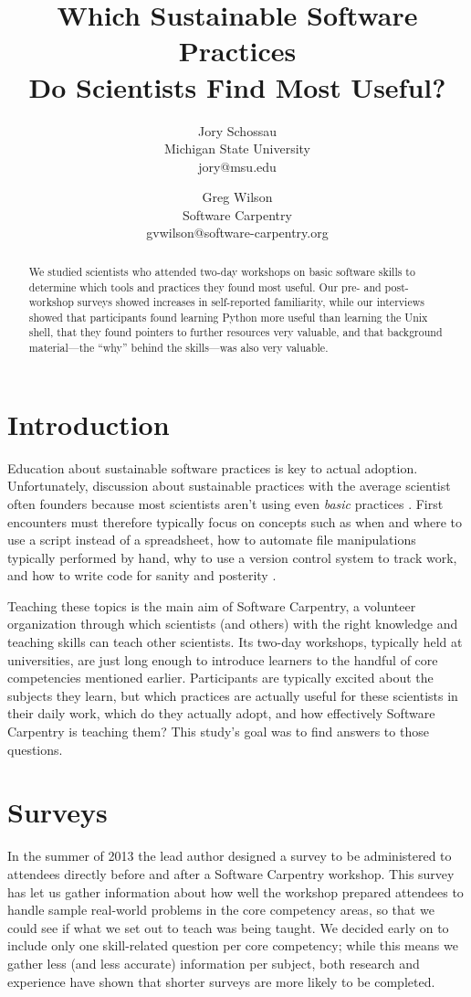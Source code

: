 \documentclass[10pt, twocolumn]{article}
\title{Which Sustainable Software Practices\\ Do Scientists Find Most Useful?}
\author{
	Jory Schossau \\
	\small{Michigan State University} \\
	\small{jory@msu.edu}
	\and
	Greg Wilson \\
	\small{Software Carpentry} \\
	\small{gvwilson@software-carpentry.org}
}
\begin{document}
\maketitle

\begin{abstract}
We studied scientists who attended two-day workshops on basic software skills
to determine which tools and practices they found most useful.
Our pre- and post-workshop surveys showed increases in self-reported familiarity,
while our interviews showed that participants found learning Python more useful than learning the Unix shell,
that they found pointers to further resources very valuable,
and that background material---the ``why'' behind the skills---was also very valuable.
\end{abstract}

\section{Introduction}

Education about sustainable software practices
is key to actual adoption.
Unfortunately,
discussion about sustainable practices with the average scientist often founders
because most scientists aren't using even \emph{basic} practices \cite{b:hannay2009,b:prabhu2011}.
First encounters must therefore typically focus on concepts such as
when and where to use a script instead of a spreadsheet,
how to automate file manipulations typically performed by hand,
why to use a version control system to track work,
and how to write code for sanity and posterity \cite{b:wilson2013}.

Teaching these topics is the main aim of Software Carpentry,
a volunteer organization through which scientists (and others)
with the right knowledge and teaching skills can teach other scientists.
Its two-day workshops,
typically held at universities,
are just long enough to introduce learners to the handful of core competencies mentioned earlier.
Participants are typically excited about the subjects they learn,
but which practices are actually useful for these scientists in their daily work,
which do they actually adopt,
and how effectively Software Carpentry is teaching them?
This study's goal was to find answers to those questions.

\section{Surveys}

In the summer of 2013
the lead author designed a survey
to be administered to attendees directly before and after a Software Carpentry workshop.
This survey has let us gather information about
how well the workshop prepared attendees to handle sample real-world problems in the core competency areas,
so that we could see if what we set out to teach was being taught.
We decided early on to include only one skill-related question per core competency;
while this means we gather less (and less accurate) information per subject,
both research and experience have shown that shorter surveys are more likely to be completed.
\end{document}
